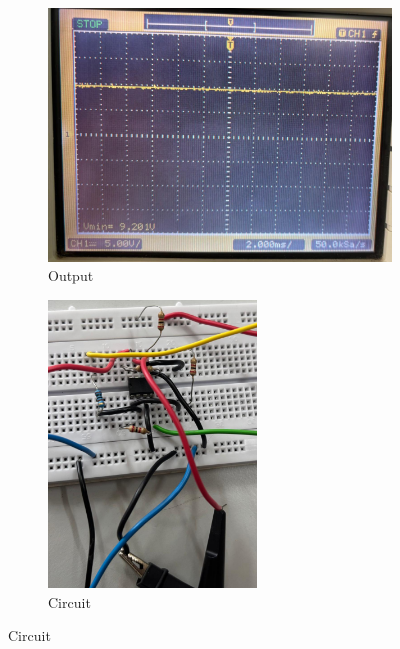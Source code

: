 \documentclass[a4paper,12pt]{article}
\begin{document}
\begin{figure}[!h]
	\begin{subfigure}[b]{100pt}
		\caption{Output}
		\includegraphics[width = 290pt]{figs/2add1.png}
	\end{subfigure}
	\hspace{110pt}
	\begin{subfigure}[b]{100pt}
		\caption{Circuit}
		\includegraphics[width = 157pt]{figs/2add2.png}
	\end{subfigure}
\end{figure}

\pagebreak
\end{document}
